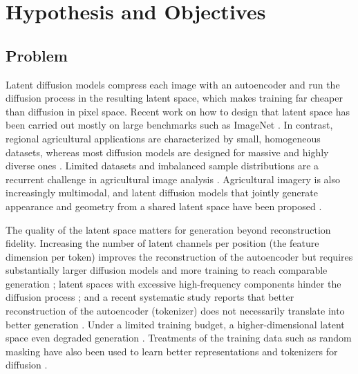 \renewcommand{\baselinestretch}{1.5}

\chapter{Hypothesis and Objectives}

\section{Problem}

Latent diffusion models \cite{Rombach2022} compress each image with an autoencoder and run the diffusion process in the resulting latent space, which makes training far cheaper than diffusion in pixel space. Recent work on how to design that latent space has been carried out mostly on large benchmarks such as ImageNet \cite{Yao2025,Skorokhodov2025,Zheng2025}. In contrast, regional agricultural applications are characterized by small, homogeneous datasets, whereas most diffusion models are designed for massive and highly diverse ones \cite{Gonzalez2026}. Limited datasets and imbalanced sample distributions are a recurrent challenge in agricultural image analysis \cite{Hu2025}. Agricultural imagery is also increasingly multimodal, and latent diffusion models that jointly generate appearance and geometry from a shared latent space have been proposed \cite{Krishnan2025}.

The quality of the latent space matters for generation beyond reconstruction fidelity. Increasing the number of latent channels per position (the feature dimension per token) improves the reconstruction of the autoencoder but requires substantially larger diffusion models and more training to reach comparable generation \cite{Yao2025}; latent spaces with excessive high-frequency components hinder the diffusion process \cite{Skorokhodov2025}; and a recent systematic study reports that better reconstruction of the autoencoder (tokenizer) does not necessarily translate into better generation \cite{Zhong2026}. Under a limited training budget, a higher-dimensional latent space even degraded generation \cite{Sehwag2025}. Treatments of the training data such as random masking have also been used to learn better representations \cite{He2022} and tokenizers for diffusion \cite{Chen2025}.

